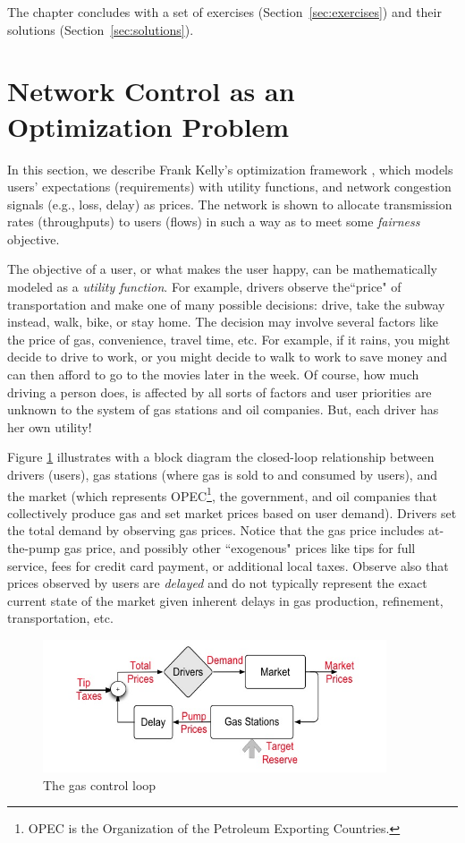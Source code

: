 \documentclass{article}
\begin{document}
The chapter concludes with a set of exercises (Section~\ref{sec:exercises})
and their solutions  (Section~\ref{sec:solutions}).

\section{Network Control as an Optimization Problem} 
\label{sec:optimization}

In this section, we describe Frank Kelly's optimization framework \cite{Kelly-2001}, which models users' expectations (requirements) with utility functions, and network congestion signals (e.g., loss, delay) as prices. The network is shown to allocate transmission rates (throughputs) to users (flows) in such a way as to meet some {\em fairness} objective.
 
The objective of a user, or what makes the user happy, can be mathematically modeled as a {\em utility function}. For example, drivers observe the``price" of transportation and make one of many possible decisions: drive, take the subway instead, walk, bike, or stay home. The decision may involve several factors like the price of gas, convenience, travel time, etc. 
For example, if it rains, you might decide to drive to work, or you might decide to walk to work to save money and can then afford to go to the movies later in the week. Of course, how much driving a person does, is affected by all sorts of factors and user priorities are unknown to the system of gas stations and oil companies. But, each driver has her own utility!

Figure \ref{fig:gas-control-loop} illustrates with a block diagram the closed-loop relationship between drivers (users), gas stations (where gas is sold to and consumed by users), and the market (which represents OPEC\footnote{OPEC is the Organization of the Petroleum Exporting Countries.}, the government, and oil companies that collectively produce gas and set market prices based on user demand). Drivers set the total demand by observing gas prices. Notice that the gas price includes at-the-pump gas price, and possibly other ``exogenous" prices like tips for full service, fees for credit card payment, or additional local taxes. Observe also that prices observed by users are {\em delayed} and do not typically represent the exact current state of the market given inherent delays in gas production, refinement, transportation, etc. 

\begin{figure}[htbp] %
   \centering 
   \includegraphics[width=4in]{figures/gas-control-loop} 
   \caption{The gas control loop}
   \label{fig:gas-control-loop}
\end{figure}
\end{document}
